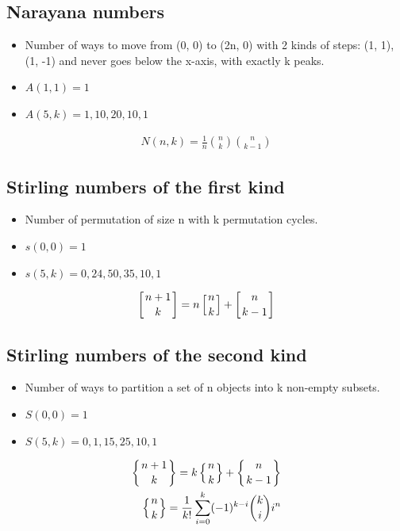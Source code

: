 \subsection{Narayana numbers}
\begin{itemize}
    \item Number of ways to move from (0, 0) to (2n, 0) with 2 kinds of steps: (1, 1), (1, -1) and never goes below the x-axis, with exactly k peaks.
    \item $A(1, 1) = 1$
    \item $A(5, k) = 1, 10, 20, 10, 1$
\end{itemize}
\begin{align*}
    N(n,k) = \frac{1}{n} \binom{n}{k} \binom{n}{k-1}
\end{align*}

\subsection{Stirling numbers of the first kind}
\begin{itemize}
    \item Number of permutation of size n with k permutation cycles.
    \item $s(0, 0) = 1$
    \item $s(5, k) = 0, 24, 50, 35, 10, 1$
\end{itemize}
\begin{align*}
    \left[ {n+1 \atop k} \right] = n \left[ {n \atop k} \right] + \left[ {n \atop k-1} \right]
\end{align*}

\subsection{Stirling numbers of the second kind}
\begin{itemize}
    \item Number of ways to partition a set of n objects into k non-empty subsets.
    \item $S(0, 0) = 1$
    \item $S(5, k) = 0, 1, 15, 25, 10, 1$
\end{itemize}
\begin{align*}
\left\{ {n+1 \atop k} \right\} = k \left\{ {n \atop k} \right\} + \left\{ {n \atop k-1} \right\} \\
\left\{ {n \atop k} \right\} = \frac{1}{k!} \sum_{i=0}^{k} (-1)^{k-i} \binom{k}{i} i^n
\end{align*}